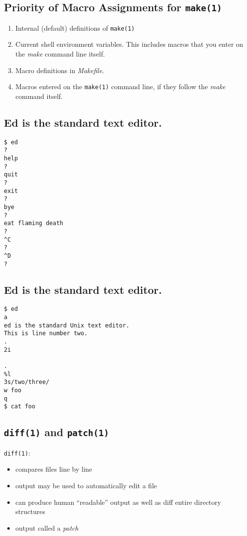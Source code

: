 \documentclass[xga]{xdvislides}
\begin{document}
\subsection{Priority of Macro Assignments for {\tt make(1)}}

\begin{enumerate}
	\item Internal (default) definitions of {\tt make(1)}
	\item Current shell environment variables.  This includes macros that you
		enter on the {\em make} command line itself.
	\item Macro definitions in {\em Makefile}.
	\item Macros entered on the {\tt make(1)} command line, if they follow
		the {\em make} command itself.
\end{enumerate}

\subsection{Ed is the standard text editor.}
\begin{verbatim}
$ ed
?
help
?
quit
?
exit
?
bye
?
eat flaming death
?
^C
?
^D
?
\end{verbatim}

\subsection{Ed is the standard text editor.}
\begin{verbatim}
$ ed
a
ed is the standard Unix text editor.
This is line number two.
.
2i

.
%l
3s/two/three/
w foo
q
$ cat foo
\end{verbatim}

\subsection{{\tt diff(1)} and {\tt patch(1)}}
{\tt diff(1)}:
\begin{itemize}
	\item compares files line by line
	\item output may be used to automatically edit a file
	\item can produce human ``readable'' output as well as diff entire
		directory structures
	\item output called a {\em patch}
\end{itemize}
\end{document}
